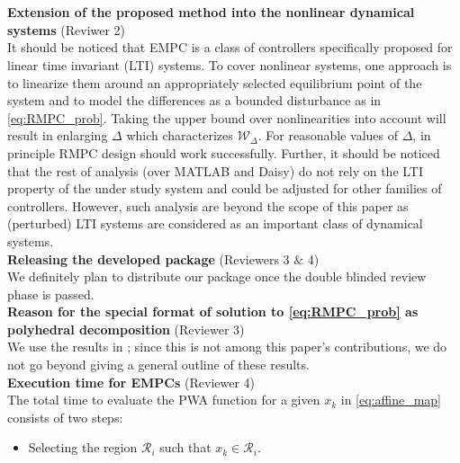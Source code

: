 {\\
\\
\textbf{Extension of the proposed method into the nonlinear dynamical systems} (Reviwer 2)\\
It should be noticed that EMPC is a class of controllers specifically proposed for linear time invariant (LTI) systems. To cover nonlinear systems, one approach is to linearize them around an appropriately selected equilibrium point of the system and to model the differences as a bounded disturbance as in \autoref{eq:RMPC_prob}. Taking the upper bound over nonlinearities into account will result in enlarging $\Delta$ which characterizes $\mathcal{W}_{\Delta}$. For reasonable values of $\Delta$, in principle RMPC design should work successfully. Further, it should be noticed that the rest of analysis (over MATLAB and Daisy) do not rely on the LTI property of the under study system and could be adjusted for other families of controllers. However, such analysis are beyond the scope of this paper as (perturbed) LTI systems are considered as an important class of dynamical systems.\\ 
\textbf{Releasing the developed package} (Reviewers 3 $\&$ 4)\\
We definitely plan to distribute our package once the double blinded review phase is passed.\\ 
\textbf{Reason for the special format of solution to \autoref{eq:RMPC_prob} as polyhedral decomposition} (Reviewer 3)\\
We use the results in \cite{delaPea:2005}; since this is not among this paper's contributions, we do not go beyond giving a general outline of these results.
\\
\textbf{Execution time for EMPCs} (Reviewer 4)\\
The total time to evaluate the PWA function for a given $x_k$ in \autoref{eq:affine_map} consists of two steps:
\begin{itemize}
\item Selecting the region $\mathcal R_i$ such that $x_k\in \mathcal R_i$.

\end{itemize}}
